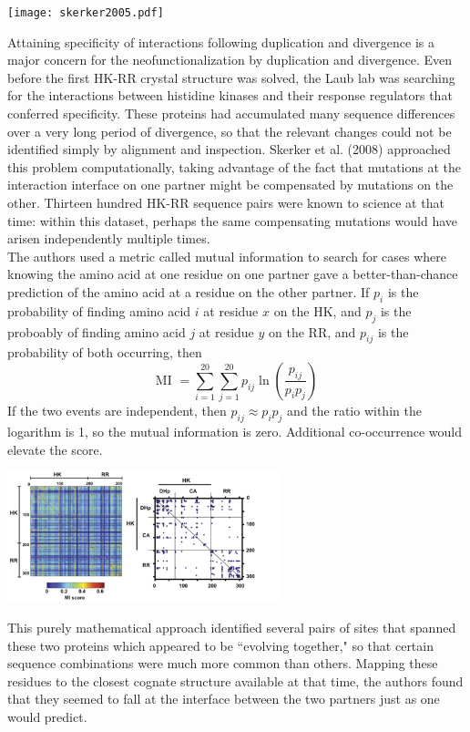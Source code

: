 \documentclass{article}
\begin{document}
\begin{center}
\texttt{[image: skerker2005.pdf]}
\end{center}

Attaining specificity of interactions following duplication and divergence is a major concern for the neofunctionalization by duplication and divergence. Even before the first HK-RR crystal structure was solved, the Laub lab was searching for the interactions between histidine kinases and their response regulators that conferred specificity. These proteins had accumulated many sequence differences over a very long period of divergence, so that the relevant changes could not be identified simply by alignment and inspection. Skerker et al. (2008) approached this problem computationally, taking advantage of the fact that mutations at the interaction interface on one partner might be compensated by mutations on the other. Thirteen hundred HK-RR sequence pairs were known to science at that time: within this dataset, perhaps the same compensating mutations would have arisen independently multiple times.\\

The authors used a metric called mutual information to search for cases where knowing the amino acid at one residue on one partner gave a better-than-chance prediction of the amino acid at a residue on the other partner. If $p_i$ is the probability of finding amino acid $i$ at residue $x$ on the HK, and $p_j$ is the proboably of finding amino acid $j$ at residue $y$ on the RR, and $p_{ij}$ is the probability of both occurring, then
\[ \textrm{MI } = \sum_{i=1}^{20} \sum_{j=1}^{20} p_{ij} \ln \left( \frac{p_{ij}}{p_i p_j} \right) \]
If the two events are independent, then $p_{ij} \approx p_i p_j$ and the ratio within the logarithm is 1, so the mutual information is zero. Additional co-occurrence would elevate the score.

\begin{center}
\includegraphics[width=0.6\textwidth]{mi.pdf}
\end{center}

This purely mathematical approach identified several pairs of sites that spanned these two proteins which appeared to be ``evolving together," so that certain sequence combinations were much more common than others. Mapping these residues to the closest cognate structure available at that time, the authors found that they seemed to fall at the interface between the two partners just as one would predict.
\end{document}
